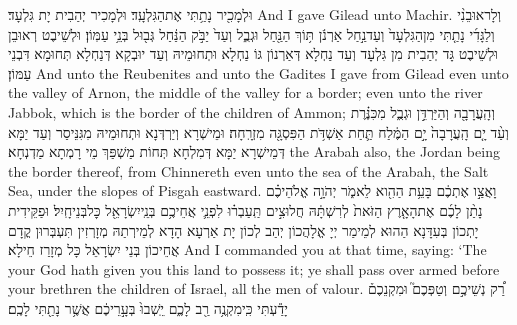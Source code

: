 {וּלְמָכִ֖יר נָתַ֥תִּי אֶת\maqqaf הַגִּלְעָֽד׃}
{וּלְמָכִיר יְהַבִית יָת גִּלְעָד׃}
{And I gave Gilead unto Machir.}{}
{וְלָראוּבֵנִ֨י וְלַגָּדִ֜י נָתַ֤תִּי מִן\maqqaf הַגִּלְעָד֙ וְעַד\maqqaf נַ֣חַל אַרְנֹ֔ן תּ֥וֹךְ הַנַּ֖חַל וּגְבֻ֑ל וְעַד֙ יַבֹּ֣ק הַנַּ֔חַל גְּב֖וּל בְּנֵ֥י עַמּֽוֹן׃}
{וּלְשֵׁיבֶט רְאוּבֵן וּלְשֵׁיבֶט גָּד יְהַבִית מִן גִּלְעָד וְעַד נַחְלָא דְּאַרְנוֹן גּוֹ נַחְלָא וּתְחוּמֵיהּ וְעַד יוּבְקָא דְּנַחְלָא תְּחוּמָא דִּבְנֵי עַמּוֹן׃}
{And unto the Reubenites and unto the Gadites I gave from Gilead even unto the valley of Arnon, the middle of the valley for a border; even unto the river Jabbok, which is the border of the children of Ammon;}{}
{וְהָֽעֲרָבָ֖ה וְהַיַּרְדֵּ֣ן וּגְבֻ֑ל מִכִּנֶּ֗רֶת וְעַ֨ד יָ֤ם הָֽעֲרָבָה֙ יָ֣ם הַמֶּ֔לַח תַּ֛חַת אַשְׁדֹּ֥ת הַפִּסְגָּ֖ה מִזְרָֽחָה׃}
{וּמֵישְׁרָא וְיַרְדְּנָא וּתְחוּמֵיהּ מִגִּנֵּיסַר וְעַד יַמָּא דְּמֵישְׁרָא יַמָּא דְּמִלְחָא תְּחוֹת מַשְׁפַּךְ מֵי רָמְתָא מַדְנְחָא׃}
{the Arabah also, the Jordan being the border thereof, from Chinnereth even unto the sea of the Arabah, the Salt Sea, under the slopes of Pisgah eastward.}{}
{וָאֲצַ֣ו אֶתְכֶ֔ם בָּעֵ֥ת הַהִ֖וא לֵאמֹ֑ר יְהֹוָ֣ה אֱלֹהֵיכֶ֗ם נָתַ֨ן לָכֶ֜ם אֶת\maqqaf הָאָ֤רֶץ הַזֹּאת֙ לְרִשְׁתָּ֔הּ חֲלוּצִ֣ים תַּֽעַבְר֗וּ לִפְנֵ֛י אֲחֵיכֶ֥ם בְּנֵֽי\maqqaf יִשְׂרָאֵ֖ל כׇּל\maqqaf בְּנֵי\maqqaf חָֽיִל׃}
{וּפַקֵּידִית יָתְכוֹן בְּעִדָּנָא הַהוּא לְמֵימַר יְיָ אֱלָהֲכוֹן יְהַב לְכוֹן יָת אַרְעָא הָדָא לְמֵירְתַהּ מְזָרְזִין תִּעְבְּרוּן קֳדָם אֲחֵיכוֹן בְּנֵי יִשְׂרָאֵל כָּל מְזָרַז חֵילָא׃}
{And I commanded you at that time, saying: ‘The \lord\space your God hath given you this land to possess it; ye shall pass over armed before your brethren the children of Israel, all the men of valour.}{}
{רַ֠ק נְשֵׁיכֶ֣ם וְטַפְּכֶם֮ וּמִקְנֵכֶם֒ יָדַ֕עְתִּי כִּֽי\maqqaf מִקְנֶ֥ה רַ֖ב לָכֶ֑ם יֵֽשְׁבוּ֙ בְּעָ֣רֵיכֶ֔ם אֲשֶׁ֥ר נָתַ֖תִּי לָכֶֽם׃}
